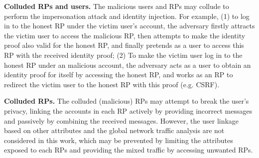 
\textbf{Colluded RPs and users.} The malicious users and RPs may collude to perform the impersonation attack and identity injection.
For example, (1) to log in to the honest RP under the victim user's account, the adversary firstly attracts the victim user to access the malicious RP, then attempts to make the identity proof also valid for the honest RP, and finally pretends as a user to access this RP with the received identity proof;
(2) To make the victim user log in to the honest RP under an malicious account, the adversary acts as a user to obtain an identity proof for itself by accessing the honest RP, and works as an RP to redirect the victim user to the honest RP with this proof (e.g. CSRF).

\textbf{Colluded RPs.} The colluded (malicious) RPs may attempt to break the user's privacy, linking the accounts in each RP actively by providing incorrect messages
and passively by combining the received messages.
However, the user linkage based on other attributes and the global network traffic analysis are not considered in this work,
which may be prevented by limiting the attributes exposed to each RPs and providing the mixed traffic by accessing unwanted RPs.

\begin{comment}
\subsection{Assumptions}
In UPRESSO, we assume the user agent deployed at the honest user is correct,
and will transmit the messages to the correct destination without leakage.
The TLS is correctly implemented at the user agent, IdP and RP, which ensures the confidentiality and integrity of the network traffic between correct entities.
We also assume the nonce is unpredictable by using  a secure random number generator;
and the adopted cryptographic algorithms, including the RSA and SHA-256 for the RP certificate, are secure and implemented correctly, that is, no one without the IdP's private key can produce a valid certificate,
and the adversary fails to infer the private key.
Moreover, the transformation of the RP's identifier and the user's account calculation are based on the Discrete Logarithm Problem,
we assume the adversary fails to infer $r$ from $g^r mod\ p$, where $p$ is a large prime and $g$ is the primitive root.
\end{comment}







